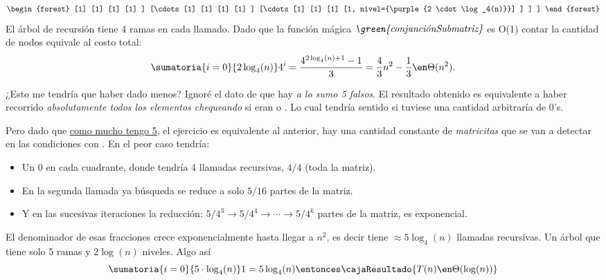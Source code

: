 \begin{enumerate}[label=\arabic*.]
{$$\begin{forest}
                        [1]
                        [1]
                        [1]
                        [1]
                      ]
                      [\cdots
                        [1]
                        [1]
                        [1]
                        [1]
                      ]
                      [\cdots
                        [1]
                        [1]
                        [1]
                        [1, nivel={\purple{2 \cdot \log_4(n)}}]
                      ]
                  ]
              ]
          \end{forest}
        $$
        }
        El árbol de recursión tiene 4 ramas en cada llamado. Dado que la función mágica $\textit{\green{conjunciónSubmatriz}}$ es O(1) contar
        la cantidad de nodos equivale al costo total:
        $$
          \sumatoria{i=0}{2\log_4(n)} 4^i = \frac{4^{2\log_4(n) + 1} - 1}{3} = \frac{4}{3}n^2 - \frac{1}{3} \en \Theta(n^2).
        $$

        ¿Esto me tendría que haber dado menos? Ignoré el dato de que hay \textit{a lo sumo 5 falsos}. El resultado obtenido es equivalente
        a haber recorrido \textit{absolutamente todos los elementos chequeando} si eran \true o \false. Lo cual
        tendría sentido si tuviese una cantidad arbitraría de 0's.

        Pero dado que \ul{como mucho tengo 5}, el ejercicio es equivalente al anterior, hay una cantidad constante de \textit{matricitas} que
        se van a detectar en las condiciones con \textit{}. En el peor caso tendría:
        \begin{itemize}
          \item Un 0 en cada cuadrante, donde tendría 4 llamadas recursivas, $4/4$ (toda la matriz).
          \item En la segunda llamada ya búsqueda se reduce a solo $5/16$ partes de la matriz.
          \item Y en las sucesivas iteraciones la reducción: $5/4^3 \to 5/4^4 \to \cdots \to 5/4^k$ partes de la matriz, es exponencial.
        \end{itemize}
        El denominador de esas fracciones crece exponencialmente hasta llegar a $n^2$, es decir tiene $\approx 5\log_4(n)$ llamadas recursivas.
        Un árbol que tiene solo 5 ramas y $2\log(n)$ niveles. Algo así
        $$
          \sumatoria{i = 0}{5 \cdot \log_4(n)} 1  = 5 \log_4(n) \entonces
          \cajaResultado{
            T(n) \en \Theta(\log(n))
          }
        $$
\end{enumerate}

\fin
